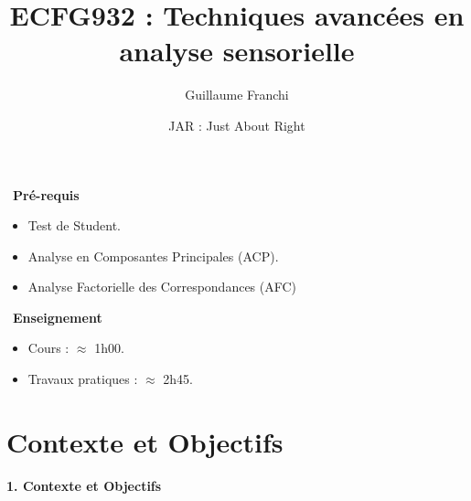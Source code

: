 \documentclass[aspectratio=169,xcolor=dvipsnames]{beamer}
\title[short title]{ECFG932 : Techniques avancées en analyse sensorielle}
\author[Surname]{Guillaume Franchi}
\institute[CBI]{Cursus Ingénieur $3^{\text{ème}}$ année}
\date{\textcolor{nyublue}{JAR : Just About  Right}}
\begin{document}
\begin{frame}[plain]

    \titlepage
    
\end{frame}

%
%
%    

\begin{frame}[plain]

\textcolor{nyubluedarker}{{\Large \faCogs \ \textbf{Pré-requis}}}
	\begin{itemize}
	\item Test de Student.
	\item Analyse en Composantes Principales (ACP).
	\item Analyse Factorielle des Correspondances (AFC)
	\end{itemize}
	
\medskip

	\textcolor{nyubluedarker}{{\Large \faChalkboardTeacher \ \textbf{Enseignement}}}
	\begin{itemize}
	\item Cours : $\approx$ 1h00.
	\item Travaux pratiques : $\approx$ 2h45.
	\end{itemize}	

\end{frame}



\section{Contexte et Objectifs}

\begin{frame}[plain]

\vfill

\begin{center}
{\huge \textcolor{nyubluedark}{\textbf{1. Contexte et Objectifs}}}
\end{center}

\vfill

\end{frame}
\end{document}
